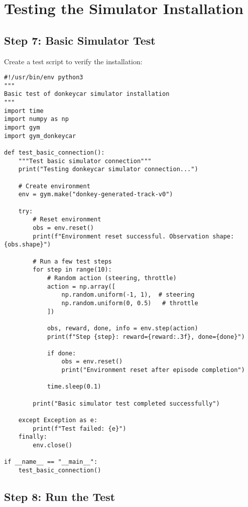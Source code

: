 \documentclass[11pt,a4paper]{article}
\begin{document}
\section{Testing the Simulator Installation}

\subsection{Step 7: Basic Simulator Test}

Create a test script to verify the installation:

\begin{lstlisting}[style=pythonstyle, caption={Basic simulator test (test\_simulator.py)}]
#!/usr/bin/env python3
"""
Basic test of donkeycar simulator installation
"""
import time
import numpy as np
import gym
import gym_donkeycar

def test_basic_connection():
    """Test basic simulator connection"""
    print("Testing donkeycar simulator connection...")
    
    # Create environment
    env = gym.make("donkey-generated-track-v0")
    
    try:
        # Reset environment
        obs = env.reset()
        print(f"Environment reset successful. Observation shape: {obs.shape}")
        
        # Run a few test steps
        for step in range(10):
            # Random action (steering, throttle)
            action = np.array([
                np.random.uniform(-1, 1),  # steering
                np.random.uniform(0, 0.5)   # throttle
            ])
            
            obs, reward, done, info = env.step(action)
            print(f"Step {step}: reward={reward:.3f}, done={done}")
            
            if done:
                obs = env.reset()
                print("Environment reset after episode completion")
            
            time.sleep(0.1)
        
        print("Basic simulator test completed successfully")
        
    except Exception as e:
        print(f"Test failed: {e}")
    finally:
        env.close()

if __name__ == "__main__":
    test_basic_connection()
\end{lstlisting}

\subsection{Step 8: Run the Test}
\end{document}
